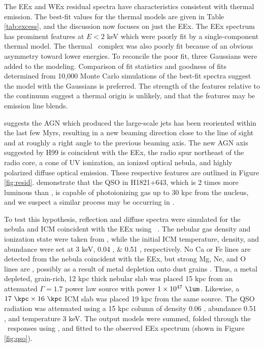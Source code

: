 \documentclass[useAMS,usenatbib]{mn2e}
\begin{document}
The EEx and WEx residual spectra have characteristics consistent with
thermal emission. The best-fit values for the thermal models are given
in Table \ref{tab:excess}, and the discussion now focuses on just the
EEx. The EEx spectrum has prominent features at $E < 2$ keV which were
poorly fit by a single-component thermal model. The thermal
\feka\ complex was also poorly fit because of an obvious asymmetry
toward lower energies. To reconcile the poor fit, three Gaussians were
added to the modeling. Comparison of fit statistics and goodness of
fits determined from 10,000 Monte Carlo simulations of the best-fit
spectra suggest the model with the Gaussians is preferred. The
strength of the features relative to the continuum suggest a thermal
origin is unlikely, and that the features may be emission line blends.

\citet[][hereafter H99]{1999ApJ...512..145H} suggests the AGN which
produced the large-scale jets has been reoriented within the last few
Myrs, resulting in a new beaming direction close to the line of sight
and at roughly a right angle to the previous beaming axis. The new AGN
axis suggested by H99 is coincident with the EEx, the radio spur
northeast of the radio core, a cone of UV ionization, an ionized
optical nebula, and highly polarized diffuse optical emission. These
respective features are outlined in Figure
\ref{fig:resid}. \citet{2010MNRAS.402.1561R} demonstrate that the QSO
in H1821+643, which is 2 times more luminous than \irs, is capable of
photoionizing gas up to 30 kpc from the nucleus, and we suspect a
similar process may be occurring in \irs.

To test this hypothesis, reflection and diffuse spectra were simulated
for the nebula and ICM coincident with the EEx using
\cloudy\ \citep{cloudy}. The nebular gas density and ionization state
were taken from \citet{2000AJ....120..562T}, while the initial ICM
temperature, density, and abundance were set at 3 keV, 0.04 \pcc, \&
0.51 \Zsol, respectively. No Ca or Fe lines are detected from the
nebula coincident with the EEx, but strong Mg, Ne, and O lines are
\citep{2000AJ....120..562T}, possibly as a result of metal depletion
onto dust grains \citep[\eg][]{1993ApJ...414L..17D}. Thus, a metal
depleted, grain-rich, 12 kpc thick nebular slab was placed 15 kpc from
an attenuated $\Gamma = 1.7$ power law source with power $1 \times
10^{47} ~\lum$. Likewise, a $17 ~\kpc \times 16 ~\kpc$ ICM slab was
placed 19 kpc from the same source. The QSO radiation was attenuated
using a 15 kpc column of density 0.06 \pcc, abundance 0.51 \Zsol, and
temperature 3 keV. The output models were summed, folded through the
\chandra\ responses using \xspec, and fitted to the observed EEx
spectrum (shown in Figure \ref{fig:qso}).
\end{document}
